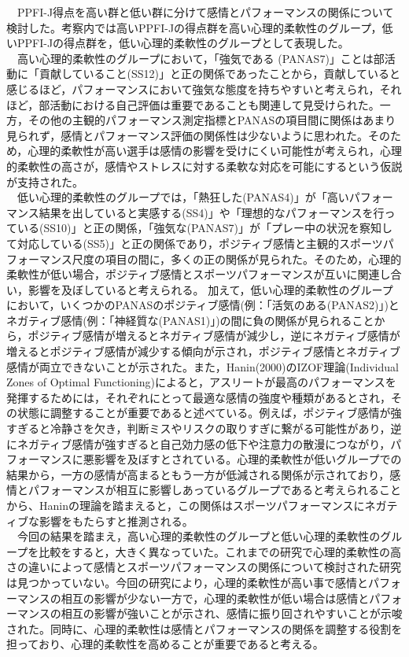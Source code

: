 \documentclass[12pt,a4paper,xelatex,ja=standard]{bxjsarticle}
\begin{document}
　PPFI-J得点を高い群と低い群に分けて感情とパフォーマンスの関係について検討した。考察内では高いPPFI-Jの得点群を高い心理的柔軟性のグループ，低いPPFI-Jの得点群を，低い心理的柔軟性のグループとして表現した。\\
　高い心理的柔軟性のグループにおいて，「強気である
(PANAS7)」ことは部活動に「貢献していること(SS12)」と正の関係であったことから，貢献していると感じるほど，パフォーマンスにおいて強気な態度を持ちやすいと考えられ，それほど，部活動における自己評価は重要であることも関連して見受けられた。一方，その他の主観的パフォーマンス測定指標とPANASの項目間に関係はあまり見られず，感情とパフォーマンス評価の関係性は少ないように思われた。そのため，心理的柔軟性が高い選手は感情の影響を受けにくい可能性が考えられ，心理的柔軟性の高さが，感情やストレスに対する柔軟な対応を可能にするという仮説が支持された。\\
　低い心理的柔軟性のグループでは，「熱狂した(PANAS4)」が「高いパフォーマンス結果を出していると実感する(SS4)」や「理想的なパフォーマンスを行っている(SS10)」と正の関係，「強気な(PANAS7)」が「プレー中の状況を察知して対応している(SS5)」と正の関係であり，ポジティブ感情と主観的スポーツパフォーマンス尺度の項目の間に，多くの正の関係が見られた。そのため，心理的柔軟性が低い場合，ポジティブ感情とスポーツパフォーマンスが互いに関連し合い，影響を及ぼしていると考えられる。
加えて，低い心理的柔軟性のグループにおいて，いくつかのPANASのポジティブ感情(例：「活気のある(PANAS2)」)とネガティブ感情(例：「神経質な(PANAS1)」)の間に負の関係が見られることから，ポジティブ感情が増えるとネガティブ感情が減少し，逆にネガティブ感情が増えるとポジティブ感情が減少する傾向が示され，ポジティブ感情とネガティブ感情が両立できないことが示された。また，Hanin(2000)のIZOF理論(Individual
Zones of Optimal
Functioning)によると，アスリートが最高のパフォーマンスを発揮するためには，それぞれにとって最適な感情の強度や種類があるとされ，その状態に調整することが重要であると述べている。例えば，ポジティブ感情が強すぎると冷静さを欠き，判断ミスやリスクの取りすぎに繋がる可能性があり，逆にネガティブ感情が強すぎると自己効力感の低下や注意力の散漫につながり，パフォーマンスに悪影響を及ぼすとされている。心理的柔軟性が低いグループでの結果から，一方の感情が高まるともう一方が低減される関係が示されており，感情とパフォーマンスが相互に影響しあっているグループであると考えられることから、Haninの理論を踏まえると，この関係はスポーツパフォーマンスにネガティブな影響をもたらすと推測される。\\
　今回の結果を踏まえ，高い心理的柔軟性のグループと低い心理的柔軟性のグループを比較をすると，大きく異なっていた。これまでの研究で心理的柔軟性の高さの違いによって感情とスポーツパフォーマンスの関係について検討された研究は見つかっていない。今回の研究により，心理的柔軟性が高い事で感情とパフォーマンスの相互の影響が少ない一方で，心理的柔軟性が低い場合は感情とパフォーマンスの相互の影響が強いことが示され、感情に振り回されやすいことが示唆された。同時に、心理的柔軟性は感情とパフォーマンスの関係を調整する役割を担っており、心理的柔軟性を高めることが重要であると考える。
　
\end{document}
